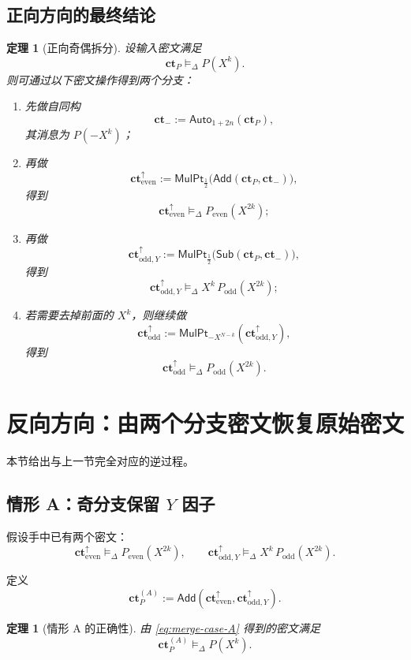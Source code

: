 \documentclass[11pt,a4paper]{ctexart}
\newcommand{\Auto}[1]{\mathsf{Auto}_{#1}}
\newcommand{\Add}{\mathsf{Add}}
\newcommand{\Sub}{\mathsf{Sub}}
\newcommand{\MulPt}[1]{\mathsf{MulPt}_{#1}}
\newcommand{\ct}{\mathbf{ct}}
\newcommand{\cte}{\mathbf{ct}_{\mathrm{even}}^{\uparrow}}
\newcommand{\ctoy}{\mathbf{ct}_{\mathrm{odd},Y}^{\uparrow}}
\newcommand{\cto}{\mathbf{ct}_{\mathrm{odd}}^{\uparrow}}
\newcommand{\rep}{\mathrel{\vDash_{\Delta}}}
\newtheorem{theorem}[definition]{定理}
\begin{document}
\subsection{正向方向的最终结论}

\begin{theorem}[正向奇偶拆分]
设输入密文满足
\[
\ct_P \rep P(X^k).
\]
则可通过以下密文操作得到两个分支：

\begin{enumerate}[label=(\arabic*)]
    \item 先做自同构
    \[
    \ct_{-}:=\Auto{1+2n}(\ct_P),
    \]
    其消息为 \(P(-X^k)\)；
    
    \item 再做
    \[
    \cte:=\MulPt{\frac12}\!\bigl(\Add(\ct_P,\ct_{-})\bigr),
    \]
    得到
    \[
    \cte \rep P_{\mathrm{even}}(X^{2k});
    \]

    \item 再做
    \[
    \ctoy:=\MulPt{\frac12}\!\bigl(\Sub(\ct_P,\ct_{-})\bigr),
    \]
    得到
    \[
    \ctoy \rep X^k\,P_{\mathrm{odd}}(X^{2k});
    \]

    \item 若需要去掉前面的 \(X^k\)，则继续做
    \[
    \cto:=\MulPt{-X^{N-k}}(\ctoy),
    \]
    得到
    \[
    \cto \rep P_{\mathrm{odd}}(X^{2k}).
    \]
\end{enumerate}
\end{theorem}

\section{反向方向：由两个分支密文恢复原始密文}

本节给出与上一节完全对应的逆过程。

\subsection{情形 A：奇分支保留 \texorpdfstring{\(Y\)}{Y} 因子}

假设手中已有两个密文：
\[
\cte \rep P_{\mathrm{even}}(X^{2k}),
\qquad
\ctoy \rep X^k\,P_{\mathrm{odd}}(X^{2k}).
\]

定义
\begin{equation}
\ct_P^{(A)}:=\Add(\cte,\ctoy). \label{eq:merge-case-A}
\end{equation}

\begin{theorem}[情形 A 的正确性]
由 \eqref{eq:merge-case-A} 得到的密文满足
\[
\ct_P^{(A)} \rep P(X^k).
\]
\end{theorem}
\end{document}
